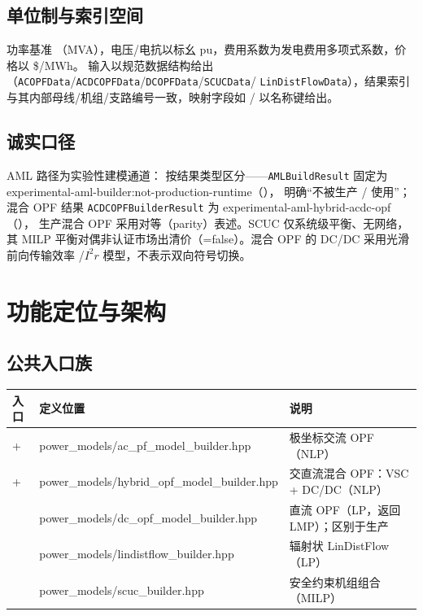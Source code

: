 \documentclass[UTF8,fontset=fandol,a4paper,11pt]{ctexart}
\begin{document}
\subsection{单位制与索引空间}
功率基准 （MVA），电压/电抗以标幺 pu，费用系数为发电费用多项式系数，价格以 \$/MWh。
输入以规范数据结构给出（\texttt{ACOPFData}/\texttt{ACDCOPFData}/\texttt{DCOPFData}/\texttt{SCUCData}/
\texttt{LinDistFlowData}），结果索引与其内部母线/机组/支路编号一致，映射字段如 /
以名称键给出。

\subsection{诚实口径}
AML 路径为实验性建模通道： 按结果类型区分——\texttt{AMLBuildResult} 固定为
experimental-aml-builder:not-production-runtime（），
明确“不被生产 /
 使用”；混合 OPF 结果 \texttt{ACDCOPFBuilderResult} 为
experimental-aml-hybrid-acdc-opf（），
生产混合 OPF 采用对等（parity）表述。SCUC 仅系统级平衡、无网络，其
MILP 平衡对偶非认证市场出清价（=false）。混合 OPF 的 DC/DC 采用光滑前向传输效率
/$I^2r$ 模型，不表示双向符号切换。

\section{功能定位与架构}
\subsection{公共入口族}
\begin{center}\footnotesize
\begin{tabular}{@{}L{6.6cm}L{3.0cm}L{5.4cm}@{}}
\toprule
入口 & 定义位置 & 说明\\
\midrule
{} +  & power\_models/ac\_pf\_model\_builder.hpp & 极坐标交流 OPF（NLP）\\
 +  & power\_models/hybrid\_opf\_model\_builder.hpp & 交直流混合 OPF：VSC + DC/DC（NLP）\\
 & power\_models/dc\_opf\_model\_builder.hpp & 直流 OPF（LP，返回 LMP）；区别于生产 \\
 & power\_models/lindistflow\_builder.hpp & 辐射状 LinDistFlow（LP）\\
 & power\_models/scuc\_builder.hpp & 安全约束机组组合（MILP）\\
\bottomrule
\end{tabular}
\end{center}
\end{document}
